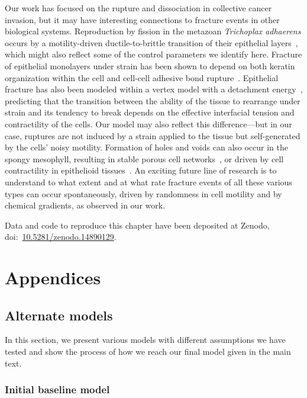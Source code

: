 Our work has focused on the rupture and dissociation in collective cancer invasion, but it may have interesting connections to fracture events in other biological systems.
Reproduction by fission in the metazoan \textit{Trichoplax adhaerens} occurs by a motility-driven ductile-to-brittle transition of their epithelial layers~\cite{prakash2021motility}, which might also reflect some of the control parameters we identify here.
Fracture of epithelial monolayers under strain has been shown to depend on both keratin organization within the cell and cell-cell adhesive bond rupture~\cite{duque2024rupture}.
Epithelial fracture has also been modeled within a vertex model with a detachment energy~\cite{chen2022activation}, predicting that the transition between the ability of the tissue to rearrange under strain and its tendency to break depends on the effective interfacial tension and contractility of the cells.
Our model may also reflect this difference---but in our case, ruptures are not induced by a strain applied to the tissue but self-generated by the cells' noisy motility.
Formation of holes and voids can also occur in the spongy mesophyll, resulting in stable porous cell networks~\cite{treado2022localized}, or driven by cell contractility in epithelioid tissues~\cite{lv2024active}.
An exciting future line of research is to understand to what extent and at what rate fracture events of all these various types can occur spontaneously, driven by randomness in cell motility and by chemical gradients, as observed in our work.

Data and code to reproduce this chapter have been deposited at Zenodo, doi:~\href{https://doi.org/10.5281/zenodo.14890129}{10.5281/zenodo.14890129}.


\section{Appendices}
\label{sec:ch2:appendices}

\subsection{Alternate models}
\label{sec:ch2:alt-models}

In this section, we present various models with different assumptions we have tested and show the process of how we reach our final model given in the main text.


\subsubsection{Initial baseline model}

